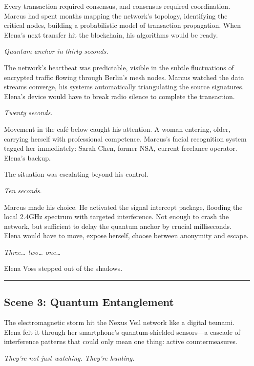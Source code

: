 Every transaction required consensus, and consensus required coordination. Marcus had spent months mapping the network's topology, identifying the critical nodes, building a probabilistic model of transaction propagation. When Elena's next transfer hit the blockchain, his algorithms would be ready.

\emph{Quantum anchor in thirty seconds.}

The network's heartbeat was predictable, visible in the subtle fluctuations of encrypted traffic flowing through Berlin's mesh nodes. Marcus watched the data streams converge, his systems automatically triangulating the source signatures. Elena's device would have to break radio silence to complete the transaction.

\emph{Twenty seconds.}

Movement in the café below caught his attention. A woman entering, older, carrying herself with professional competence. Marcus's facial recognition system tagged her immediately: Sarah Chen, former NSA, current freelance operator. Elena's backup.

The situation was escalating beyond his control.

\emph{Ten seconds.}

Marcus made his choice. He activated the signal intercept package, flooding the local 2.4GHz spectrum with targeted interference. Not enough to crash the network, but sufficient to delay the quantum anchor by crucial milliseconds. Elena would have to move, expose herself, choose between anonymity and escape.

\emph{Three\ldots{} two\ldots{} one\ldots{}}

Elena Voss stepped out of the shadows.

\begin{center}\rule{0.5\linewidth}{0.5pt}\end{center}

\hypertarget{scene-3-quantum-entanglement}{%
\subsection{Scene 3: Quantum Entanglement}\label{scene-3-quantum-entanglement}}

The electromagnetic storm hit the Nexus Veil network like a digital tsunami. Elena felt it through her smartphone's quantum-shielded sensors---a cascade of interference patterns that could only mean one thing: active countermeasures.

\emph{They're not just watching. They're hunting.}

